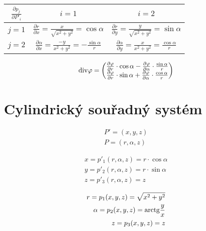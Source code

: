 \begin{tabular}{| c || c | c |}
\hline
\(\frac{\partial p_j}{\partial P'_i}\) & \(i=1\) & \(i=2\) \\
\hline
\hline
\(j=1\) & \(\frac{\partial r}{\partial x} = \frac{x}{\sqrt{x^2 + y^2}} = \cos \alpha\) & \(\frac{\partial r}{\partial y} = \frac{y}{\sqrt{x^2 + y^2}} = \sin \alpha\) \\
\hline
\(j=2\) & \(\frac{\partial \alpha}{\partial x} = \frac{-y}{x^2 + y^2} = -\frac{\sin \alpha}{r}\) & \(\frac{\partial \alpha}{\partial y} = \frac{x}{x^2 + y^2} = \frac{\cos \alpha}{r}\) \\
\hline
\end{tabular}

\begin{equation}
\mathrm{div}{\varphi} = \begin{pmatrix}
\frac{\partial \varphi}{\partial r} \cdot \cos \alpha - \frac{\partial \varphi}{\partial \alpha} \cdot \frac{\sin \alpha}{r} \\
\frac{\partial \varphi}{\partial r} \cdot \sin \alpha + \frac{\partial \varphi}{\partial \alpha} \cdot \frac{\cos \alpha}{r}
\end{pmatrix} 
\end{equation}


\section{Cylindrický souřadný systém}

\begin{equation}
\begin{split}
P' = (x, y, z) \\
P = (r, \alpha, z)
\end{split}
\end{equation}

\begin{equation}
\begin{split}
x = p'_1(r, \alpha, z) = r \cdot \cos \alpha \\
y = p'_2(r, \alpha, z) = r \cdot \sin \alpha \\
z = p'_3(r, \alpha, z) = z
\end{split}
\end{equation}

\begin{equation}
\begin{split}
r = p_1(x, y, z) = \sqrt{x^2 + y^2} \\
\alpha = p_2(x, y, z) = \mathrm{arctg} \frac{y}{x} \\
z = p_3(x, y, z) = z
\end{split}
\end{equation}

